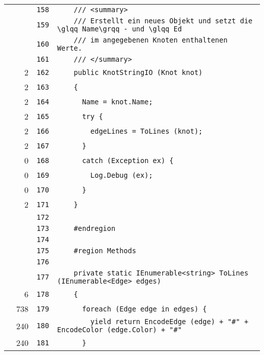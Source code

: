 \documentclass[a4paper,10pt]{article}
\begin{document}
\begin{longtable}[l]{lrrl}
\cellcolor{gray} &  & \verb~158~ & \verb~    /// <summary>~\\
\cellcolor{gray} &  & \verb~159~ & \verb~    /// Erstellt ein neues Objekt und setzt die \glqq Name\grqq - und \glqq Ed~\\
\cellcolor{gray} &  & \verb~160~ & \verb~    /// im angegebenen Knoten enthaltenen Werte.~\\
\cellcolor{gray} &  & \verb~161~ & \verb~    /// </summary>~\\
\cellcolor{green} & 2 & \verb~162~ & \verb~    public KnotStringIO (Knot knot)~\\
\cellcolor{green} & 2 & \verb~163~ & \verb~    {~\\
\cellcolor{green} & 2 & \verb~164~ & \verb~      Name = knot.Name;~\\
\cellcolor{green} & 2 & \verb~165~ & \verb~      try {~\\
\cellcolor{green} & 2 & \verb~166~ & \verb~        edgeLines = ToLines (knot);~\\
\cellcolor{green} & 2 & \verb~167~ & \verb~      }~\\
\cellcolor{red} & 0 & \verb~168~ & \verb~      catch (Exception ex) {~\\
\cellcolor{red} & 0 & \verb~169~ & \verb~        Log.Debug (ex);~\\
\cellcolor{red} & 0 & \verb~170~ & \verb~      }~\\
\cellcolor{green} & 2 & \verb~171~ & \verb~    }~\\
\cellcolor{gray} &  & \verb~172~ & \verb~~\\
\cellcolor{gray} &  & \verb~173~ & \verb~    #endregion~\\
\cellcolor{gray} &  & \verb~174~ & \verb~~\\
\cellcolor{gray} &  & \verb~175~ & \verb~    #region Methods~\\
\cellcolor{gray} &  & \verb~176~ & \verb~~\\
\cellcolor{gray} &  & \verb~177~ & \verb~    private static IEnumerable<string> ToLines (IEnumerable<Edge> edges)~\\
\cellcolor{green} & 6 & \verb~178~ & \verb~    {~\\
\cellcolor{green} & 738 & \verb~179~ & \verb~      foreach (Edge edge in edges) {~\\
\cellcolor{green} & 240 & \verb~180~ & \verb~        yield return EncodeEdge (edge) + "#" + EncodeColor (edge.Color) + "#" ~\\
\cellcolor{green} & 240 & \verb~181~ & \verb~      }~\\

\end{longtable}
\end{document}
